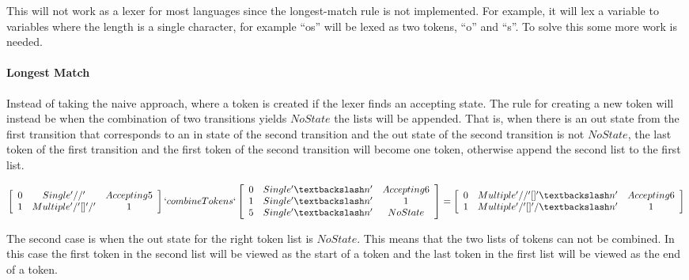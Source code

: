 This will not work as a lexer for most languages since the longest-match rule is
not implemented. For example, it will lex a variable to variables where the
length is a single character, for example ``os'' will be lexed as two tokens,
``o'' and ``s''. To solve this some more work is needed.

\paragraph{Longest Match}\label{longmatch}
Instead of taking the naive approach, where a token is created if the lexer finds an
accepting state. The rule for creating a new token will instead be when the
combination of two transitions yields $NoState$ the lists will be appended. That
is, when there is an out state from the first transition that corresponds to an
in state of the second transition and the out state of the second transition
is not $NoState$, the last token of the first transition and the first token of
the second transition will become one token, otherwise append the second list to
the first list.
\begin{center}
$\left[\begin{array}{ccc}
0&Single '//'& Accepting 5\\
1&Multiple '/' [] '/' &1\\
\end{array}\right] `combineTokens` 
\left[\begin{array}{ccc}
0&Single '\textbackslash n'&Accepting 6\\
1&Single '\textbackslash n'&1\\
5&Single '\textbackslash n'&NoState\\
\end{array}\right] =
\left[\begin{array}{ccc}
0&Multiple '//' [] '\textbackslash n'&Accepting 6\\
1&Multiple '/' [] '/\textbackslash n'&1\\
\end{array}\right]$
\end{center}
The second case is when the out state for the right token list is $NoState$.
This means that the two lists of tokens can not be combined. In this case the
first token in the second list will be viewed as the start of a token and the
last token in the first list will be viewed as the end of a token.                                                                                               

